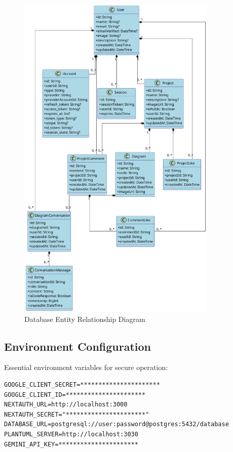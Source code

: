 \begin{figure}[H]
  \centering
  \includegraphics[width=0.85\textwidth]{conception/SprintI/global_class_diagram.png}
  \caption{Database Entity Relationship Diagram}
  \label{fig:database_schema}
\end{figure}

\subsection{Environment Configuration}

Essential environment variables for secure operation:

\begin{lstlisting}[caption=Environment Variables]
GOOGLE_CLIENT_SECRET=**********************
GOOGLE_CLIENT_ID=**********************
NEXTAUTH_URL=http://localhost:3000
NEXTAUTH_SECRET="**********************"
DATABASE_URL=postgresql://user:password@postgres:5432/database
PLANTUML_SERVER=http://localhost:3030
GEMINI_API_KEY=**********************
\end{lstlisting}

